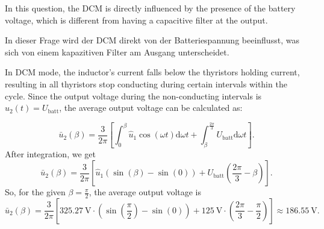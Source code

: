 \begin{hintblock}
In this question, the DCM is directly influenced by the presence of the battery voltage, which is different from having a capacitive filter at the output.
\end{hintblock}
\begin{germanhintblock}
In dieser Frage wird der DCM direkt von der Batteriespannung beeinflusst, was sich von einem kapazitiven Filter am Ausgang unterscheidet.
\end{germanhintblock}


\begin{solutionblock}
In DCM mode, the inductor's current falls below the thyristors holding current, resulting in all thyristors stop conducting during certain intervals within the cycle. Since the output voltage during the non-conducting intervals is $u_\mathrm{2}(t) = U_\mathrm{batt}$, the average output voltage can be calculated as:

            $$\bar{u}_\mathrm{2}(\beta) = \frac{3}{2\pi} \left[\int_{0}^{\beta} \hat{u}_\mathrm{1}\cos(\omega t) \mathrm{d}\omega t +  \int_{\beta}^{\frac{2\pi}{3}} U_\mathrm{batt} \mathrm{d}\omega t \right].$$
            After integration, we get
           $$  \bar{u}_\mathrm{2}(\beta) = \frac{3}{2\pi} \left[ \hat{u}_\mathrm{1}(\sin(\beta)-\sin(0))  + U_\mathrm{batt} (\frac{2\pi}{3} - \beta)\right].$$
            So, for the given $\beta =\frac{\pi}{2}$, the average output voltage is
           $$  \bar{u}_\mathrm{2}(\beta) = \frac{3}{2\pi} \left[ \SI{325.27}{\volt}\cdot(\sin(\frac{\pi}{2})-\sin(0))  + \SI{125}{\volt} \cdot (\frac{2\pi}{3} - \frac{\pi}{2})\right] \approx \SI{186.55}{\volt}.$$

\end{solutionblock}
